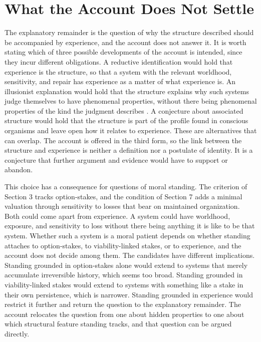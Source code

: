 \documentclass[11pt]{article}
\theoremstyle{definition}
\theoremstyle{plain}
\theoremstyle{remark}
\begin{document}
\section{What the Account Does Not Settle}

The explanatory remainder is the question of why the structure described should be accompanied by experience, and the account does not answer it. It is worth stating which of three possible developments of the account is intended, since they incur different obligations. A reductive identification would hold that experience is the structure, so that a system with the relevant worldhood, sensitivity, and repair has experience as a matter of what experience is. An illusionist explanation would hold that the structure explains why such systems judge themselves to have phenomenal properties, without there being phenomenal properties of the kind the judgment describes \cite{frankish2016,chalmers1995}. A conjecture about associated structure would hold that the structure is part of the profile found in conscious organisms and leave open how it relates to experience. These are alternatives that can overlap. The account is offered in the third form, so the link between the structure and experience is neither a definition nor a postulate of identity. It is a conjecture that further argument and evidence would have to support or abandon.

This choice has a consequence for questions of moral standing. The criterion of Section 3 tracks option-stakes, and the condition of Section 7 adds a minimal valuation through sensitivity to losses that bear on maintained organization. Both could come apart from experience. A system could have worldhood, exposure, and sensitivity to loss without there being anything it is like to be that system. Whether such a system is a moral patient depends on whether standing attaches to option-stakes, to viability-linked stakes, or to experience, and the account does not decide among them. The candidates have different implications. Standing grounded in option-stakes alone would extend to systems that merely accumulate irreversible history, which seems too broad. Standing grounded in viability-linked stakes would extend to systems with something like a stake in their own persistence, which is narrower. Standing grounded in experience would restrict it further and return the question to the explanatory remainder. The account relocates the question from one about hidden properties to one about which structural feature standing tracks, and that question can be argued directly.
\end{document}
